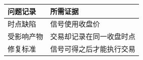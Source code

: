\begin{tabular}{@{}P{4.0cm}P{8.5cm}@{}}
\toprule
\textbf{问题记录} & \textbf{所需证据} \\
\midrule
时点缺陷 & 信号使用收盘价 \\
受影响产物 & 交易却记录在同一收盘时点 \\
修复标准 & 信号可得之后才能执行交易 \\
\bottomrule
\end{tabular}
